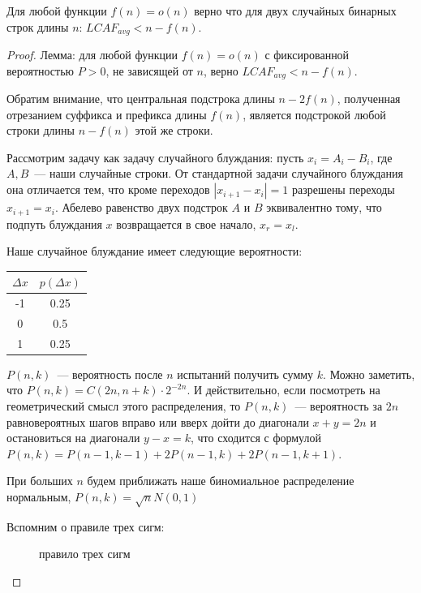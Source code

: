 \begin{theorem} %
Для любой функции $f(n)=o(n)$ верно что для двух случайных бинарных строк длины $n$: $LCAF_{avg} < n - f(n)$.
\end{theorem}
\begin{proof}

Лемма: для любой функции $f(n)=o(n)$ с фиксированной вероятностью $P>0$, не зависящей от $n$, верно $LCAF_{avg} < n - f(n)$.

Обратим внимание, что центральная подстрока длины $n-2f(n)$, полученная отрезанием суффикса и префикса длины $f(n)$, является подстрокой любой строки длины $n-f(n)$ этой же строки.

Рассмотрим задачу как задачу случайного блуждания: пусть $x_i = A_i - B_i$, где $A, B$~--- наши случайные строки. От стандартной задачи случайного блуждания она отличается тем, что кроме переходов $|x_{i+1}-x_i|=1$ разрешены переходы $x_{i+1}=x_i$. Абелево равенство двух подстрок $A$ и $B$ эквивалентно тому, что подпуть блуждания $x$ возвращается в свое начало, $x_r=x_l$.

Наше случайное блуждание имеет следующие вероятности:

\begin{tabular}{|c|c|}
\hline
$\Delta x$ & $p(\Delta x)$ \\
\hline
-1 & 0.25 \\
\hline
0 & 0.5 \\
\hline
1 & 0.25 \\
\hline
\end{tabular}

$P(n, k)$~--- вероятность после $n$ испытаний получить сумму $k$. Можно заметить, что $P(n, k)=C(2n, n+k)\cdot 2^{-2n}$. И действительно, если посмотреть на геометрический смысл этого распределения, то $P(n,k)$~--- вероятность за $2n$ равновероятных шагов вправо или вверх дойти до диагонали $x+y=2n$ и остановиться на диагонали $y-x=k$, что сходится с формулой $P(n,k)=P(n-1,k-1)+2P(n-1,k)+2P(n-1,k+1)$.

При больших $n$ будем приближать наше биномиальное распределение нормальным, $P(n, k)=\sqrt {n} N(0,1)$ %

Вспомним о правиле трех сигм:

\begin{figure}[h]
\caption{правило трех сигм \cite{3}}
\end{figure}


\end{proof}
